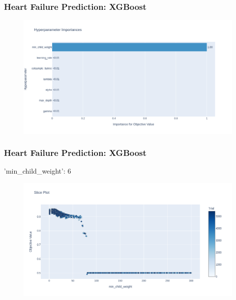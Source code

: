 \documentclass{beamer}
\begin{document}
\begin{frame}
\frametitle{Heart Failure Prediction: XGBoost}
\begin{figure}[H]

 \label{fig:op:dia:lamb:lgbm}
 \centering
 \includegraphics[scale=0.3]{optuna_xgboost_importance_heart.png}
\end{figure}
\end{frame}
\begin{frame}
\frametitle{Heart Failure Prediction: XGBoost}
'min\_child\_weight': 6
\begin{figure}[H]
 \centering
 \includegraphics[scale=0.3]{optuna_xgboost_min_heart.png}
\end{figure}
\end{frame}
\end{document}
